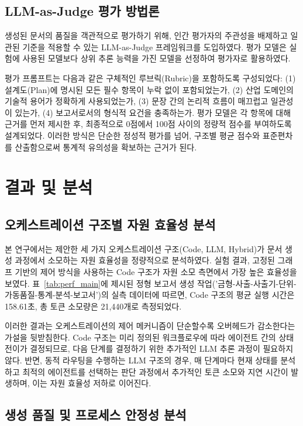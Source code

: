 \documentclass[10pt,twocolumn]{article}
\begin{document}
\subsection{LLM-as-Judge 평가 방법론}
생성된 문서의 품질을 객관적으로 평가하기 위해, 인간 평가자의 주관성을 배제하고 일관된 기준을 적용할 수 있는 LLM-as-Judge 프레임워크를 도입하였다. 평가 모델은 실험에 사용된 모델보다 상위 추론 능력을 가진 모델을 선정하여 평가자로 활용하였다.

평가 프롬프트는 다음과 같은 구체적인 루브릭(Rubric)을 포함하도록 구성되었다: (1) 설계도(Plan)에 명시된 모든 필수 항목이 누락 없이 포함되었는가, (2) 산업 도메인의 기술적 용어가 정확하게 사용되었는가, (3) 문장 간의 논리적 흐름이 매끄럽고 일관성이 있는가, (4) 보고서로서의 형식적 요건을 충족하는가. 평가 모델은 각 항목에 대해 근거를 먼저 제시한 후, 최종적으로 0점에서 100점 사이의 정량적 점수를 부여하도록 설계되었다. 이러한 방식은 단순한 정성적 평가를 넘어, 구조별 평균 점수와 표준편차를 산출함으로써 통계적 유의성을 확보하는 근거가 된다.

\section{결과 및 분석}
\subsection{오케스트레이션 구조별 자원 효율성 분석}

본 연구에서는 제안한 세 가지 오케스트레이션 구조(Code, LLM, Hybrid)가 문서 생성 과정에서 소모하는 자원 효율성을 정량적으로 분석하였다. 실험 결과, 고정된 그래프 기반의 제어 방식을 사용하는 Code 구조가 자원 소모 측면에서 가장 높은 효율성을 보였다. 표~\ref{tab:perf_main}에 제시된 정형 보고서 생성 작업('금형-사출-사출기-단위-가동품질-통계-분석-보고서')의 실측 데이터에 따르면, Code 구조의 평균 실행 시간은 158.61초, 총 토큰 소모량은 21,440개로 측정되었다.

이러한 결과는 오케스트레이션의 제어 메커니즘이 단순할수록 오버헤드가 감소한다는 가설을 뒷받침한다. Code 구조는 미리 정의된 워크플로우에 따라 에이전트 간의 상태 전이가 결정되므로, 다음 단계를 결정하기 위한 추가적인 LLM 추론 과정이 필요하지 않다. 반면, 동적 라우팅을 수행하는 LLM 구조의 경우, 매 단계마다 현재 상태를 분석하고 최적의 에이전트를 선택하는 판단 과정에서 추가적인 토큰 소모와 지연 시간이 발생하며, 이는 자원 효율성 저하로 이어진다.

\subsection{생성 품질 및 프로세스 안정성 분석}
\end{document}
